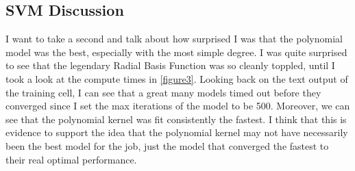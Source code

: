 \documentclass[12pt]{article}
\begin{document}
\subsection{SVM Discussion}
I want to take a second and talk about how surprised I was that the polynomial model was the best, especially with 
the most simple degree. I was quite surprised to see that the legendary Radial Basis Function was so cleanly toppled, until 
I took a look at the compute times in \ref{figure3}. Looking back on the text output of the training cell, I can see that
a great many models timed out before they converged since I set the max iterations of the model to be 500. Moreover, we can 
see that the polynomial kernel was fit consistently the fastest. I think that this is evidence to support the idea that the 
polynomial kernel may not have necessarily been the best model for the job, just the model that converged the fastest to their
real optimal performance. 
\end{document}
